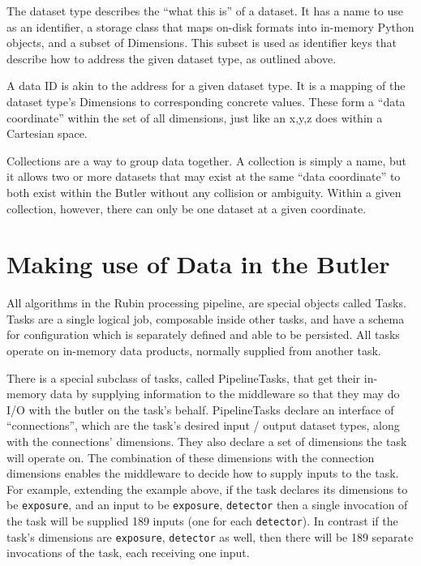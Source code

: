 \documentclass[11pt,twoside]{article}
\begin{document}
The dataset type describes the ``what this is'' of a dataset. It has a name to use as an identifier, a storage class that maps on-disk formats into in-memory Python objects, and a subset of Dimensions. This subset is used as identifier keys that describe how to address the given dataset type, as outlined above.

A data ID is akin to the address for a given dataset type. It is a mapping of the dataset type's Dimensions to corresponding concrete values. These form a ``data coordinate'' within the set of all dimensions, just like an x,y,z does within a Cartesian space.

Collections are a way to group data together. A collection is simply a name, but it allows two or more datasets that may exist at the same ``data coordinate'' to both exist within the Butler without any collision or ambiguity. Within a given collection, however, there can only be one dataset at a given coordinate.

\section{Making use of Data in the Butler}
All algorithms in the Rubin processing pipeline, are special objects called Tasks. Tasks are a single logical job, composable inside other tasks, and have a schema for configuration which is separately defined and able to be persisted. All tasks operate on in-memory data products, normally supplied from another task.

There is a special subclass of tasks, called PipelineTasks, that get their in-memory data by supplying information to the middleware so that they may do I/O with the butler on the task's behalf. PipelineTasks declare an interface of ``connections'', which are the task's desired input / output dataset types, along with the connections' dimensions. They also declare a set of dimensions the task will operate on. The combination of these dimensions with the connection dimensions enables the middleware to decide how to supply inputs to the task. For example, extending the example above, if the task declares its dimensions to be \texttt{exposure}, and an input to be \texttt{exposure}, \texttt{detector} then a single invocation of the task will be supplied 189 inputs (one for each \texttt{detector}). In contrast if the task's dimensions are \texttt{exposure}, \texttt{detector} as well, then there will be 189 separate invocations of the task, each receiving one input.
\end{document}
